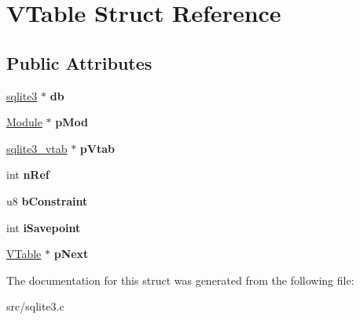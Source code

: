 \hypertarget{struct_v_table}{\section{V\-Table Struct Reference}
\label{struct_v_table}
}
\subsection*{Public Attributes}
\begin{DoxyCompactItemize}
\item 
\hypertarget{struct_v_table_a855b43c118d693910e9060cc9d9ac91a}{\hyperlink{structsqlite3}{sqlite3} $\ast$ {\bfseries db}}\label{struct_v_table_a855b43c118d693910e9060cc9d9ac91a}

\item 
\hypertarget{struct_v_table_ae444452a7168e2f4224a75768abe8312}{\hyperlink{struct_module}{Module} $\ast$ {\bfseries p\-Mod}}\label{struct_v_table_ae444452a7168e2f4224a75768abe8312}

\item 
\hypertarget{struct_v_table_ae15b9cb002c013019dcbac919bda9ac8}{\hyperlink{structsqlite3__vtab}{sqlite3\-\_\-vtab} $\ast$ {\bfseries p\-Vtab}}\label{struct_v_table_ae15b9cb002c013019dcbac919bda9ac8}

\item 
\hypertarget{struct_v_table_a12ffe156e5e8e7d19ed029ccfe4ab5dc}{int {\bfseries n\-Ref}}\label{struct_v_table_a12ffe156e5e8e7d19ed029ccfe4ab5dc}

\item 
\hypertarget{struct_v_table_a5a970416a76dbe3be500c9458c89550d}{u8 {\bfseries b\-Constraint}}\label{struct_v_table_a5a970416a76dbe3be500c9458c89550d}

\item 
\hypertarget{struct_v_table_a19f1c6c5f5fedabba7e605bbe15358e4}{int {\bfseries i\-Savepoint}}\label{struct_v_table_a19f1c6c5f5fedabba7e605bbe15358e4}

\item 
\hypertarget{struct_v_table_af3cac5e5a38508d0111acb9aa6c5f435}{\hyperlink{struct_v_table}{V\-Table} $\ast$ {\bfseries p\-Next}}\label{struct_v_table_af3cac5e5a38508d0111acb9aa6c5f435}

\end{DoxyCompactItemize}


The documentation for this struct was generated from the following file\-:\begin{DoxyCompactItemize}
\item 
src/sqlite3.\-c\end{DoxyCompactItemize}
